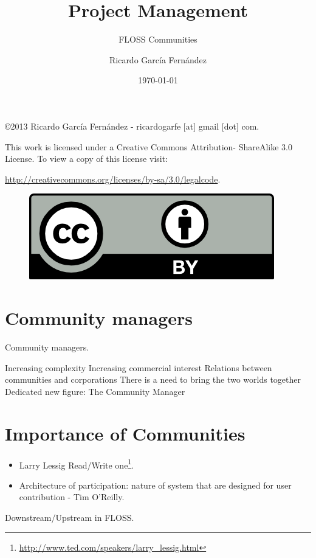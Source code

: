 \documentclass[11pt]{scrartcl}
\title{\textbf{Project Management}}
\subtitle{FLOSS Communities}
\author{Ricardo Garc\'ia Fern\'andez}
\date{\today}
\begin{document}
\maketitle

\vfill

\begin{flushright}
    \copyright  2013 Ricardo Garc\'ia Fern\'andez - ricardogarfe [at] gmail [dot] com.

    This work is licensed under a Creative Commons Attribution- ShareAlike 3.0 License.
    To view a copy of this license visit:
 
    \url{http://creativecommons.org/licenses/by-sa/3.0/legalcode}.
\end{flushright}

\begin{figure}[h]
    \begin{flushright}	
        \includegraphics{by}
        \label{fig:by-sa}
    \end{flushright}
\end{figure}

\newpage

\section{Community managers}

Community managers.

Increasing complexity
Increasing commercial interest
Relations between communities and corporations
There is a need to bring the two worlds together
Dedicated new figure: The Community Manager

\section{Importance of Communities}
\label{sec:importance}

\begin{itemize}
	\item Larry Lessig Read/Write one\footnote{\url{http://www.ted.com/speakers/larry_lessig.html}}.
	\item Architecture of participation: nature of system that are designed for user contribution - Tim O'Reilly.
\end{itemize}

Downstream/Upstream in FLOSS.

\end{document}
